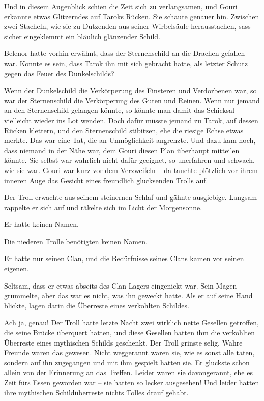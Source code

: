 \documentclass[10pt, a4paper, oneside]{book}
\begin{document}
Und in diesem Augenblick schien die Zeit sich zu verlangsamen, und Gouri erkannte etwas Glitzerndes auf Taroks Rücken. Sie schaute genauer hin. Zwischen zwei Stacheln, wie sie zu Dutzenden aus seiner Wirbelsäule herausstachen, sass sicher eingeklemmt ein bläulich glänzender Schild.

Belenor hatte vorhin erwähnt, dass der Sternenschild an die Drachen gefallen war. Konnte es sein, dass Tarok ihn mit sich gebracht hatte, als letzter Schutz gegen das Feuer des Dunkelschilds?

Wenn der Dunkelschild die Verkörperung des Finsteren und Verdorbenen war, so war der Sternenschild die Verkörperung des Guten und Reinen. Wenn nur jemand an den Sternenschild gelangen könnte, so könnte man damit das Schicksal vielleicht wieder ins Lot wenden. Doch dafür müsste jemand zu Tarok, auf dessen Rücken klettern, und den Sternenschild stibitzen, ehe die riesige Echse etwas merkte. Das war eine Tat, die an Unmöglichkeit angrenzte. Und dazu kam noch, dass niemand in der Nähe war, dem Gouri diesen Plan überhaupt mitteilen könnte. Sie selbst war wahrlich nicht dafür geeignet, so unerfahren und schwach, wie sie war. Gouri war kurz vor dem Verzweifeln – da tauchte plötzlich vor ihrem inneren Auge das Gesicht eines freundlich glucksenden Trolls auf.\bigskip



Der Troll erwachte aus seinem steinernen Schlaf und gähnte ausgiebige. Langsam rappelte er sich auf und räkelte sich im Licht der Morgensonne.

Er hatte keinen Namen.

Die niederen Trolle benötigten keinen Namen.

Er hatte nur seinen Clan, und die Bedürfnisse seines Clans kamen vor seinen eigenen.

Seltsam, dass er etwas abseits des Clan-Lagers eingenickt war. Sein Magen grummelte, aber das war es nicht, was ihn geweckt hatte. Als er auf seine Hand blickte, lagen darin die Überreste eines verkohlten Schildes.

Ach ja, genau! Der Troll hatte letzte Nacht zwei wirklich nette Gesellen getroffen, die seine Brücke überquert hatten, und diese Gesellen hatten ihm die verkohlten Überreste eines mythischen Schilds geschenkt. Der Troll grinste selig. Wahre Freunde waren das gewesen. Nicht weggerannt waren sie, wie es sonst alle taten, sondern auf ihn zugegangen und mit ihm gespielt hatten sie. Er gluckste schon allein von der Erinnerung an das Treffen. Leider waren sie davongerannt, ehe es Zeit fürs Essen geworden war – sie hatten so lecker ausgesehen! Und leider hatten ihre mythischen Schildüberreste nichts Tolles drauf gehabt.
\end{document}
